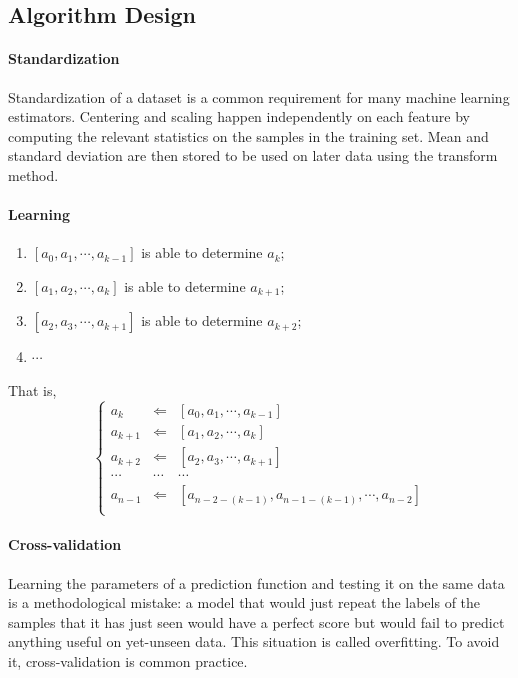 \documentclass[a0b,portrait]{a0poster}
\begin{document}
\begin{multicols}{3}
\subsection*{Algorithm Design}
\paragraph*{Standardization}
Standardization of a dataset is a common requirement for many machine learning estimators. Centering and scaling happen independently on each feature by computing the relevant statistics on the samples in the training set. Mean and standard deviation are then stored to be used on later data using the transform method.

\paragraph*{Learning}
\begin{enumerate}
\item $\left[a_0, a_1, \cdots, a_{k - 1}\right]$ is able to determine $a_{k}$;
\item $\left[a_1, a_2, \cdots, a_{k}\right]$ is able to determine $a_{k + 1}$;
\item $\left[a_2, a_3, \cdots, a_{k + 1}\right]$ is able to determine $a_{k + 2}$;
\item $\cdots$
\end{enumerate}
That is,
\begin{equation}
\left\{
\begin{array}{rcl}
a_{k} & \Leftarrow & \left[a_0, a_1, \cdots, a_{k - 1}\right]\\
a_{k + 1} & \Leftarrow & \left[a_1, a_2, \cdots, a_{k}\right]\\
a_{k + 2} & \Leftarrow & \left[a_2, a_3, \cdots, a_{k + 1}\right]\\
\cdots & \cdots & \cdots\\
a_{n - 1} & \Leftarrow & \left[a_{n - 2 - \left(k - 1\right)}, a_{n - 1 - \left(k - 1\right)}, \cdots, a_{n - 2}\right]\\
\end{array}
\right.
\end{equation}
\paragraph*{Cross-validation}
Learning the parameters of a prediction function and testing it on the same data is a methodological mistake: a model that would just repeat the labels of the samples that it has just seen would have a perfect score but would fail to predict anything useful on yet-unseen data. This situation is called overfitting. To avoid it, cross-validation is common practice.

\end{multicols}
\end{document}
